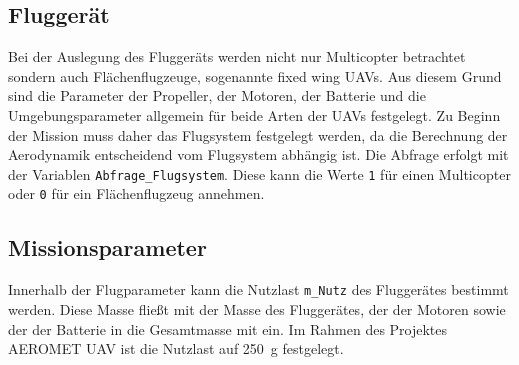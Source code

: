  
\subsection{Fluggerät}
\label{subsec:fluggerät}
Bei der Auslegung des Fluggeräts werden nicht nur Multicopter betrachtet sondern auch Flächenflugzeuge, sogenannte fixed wing UAVs. Aus diesem Grund sind die Parameter der Propeller, der Motoren, der Batterie und die Umgebungsparameter allgemein für beide Arten der UAVs festgelegt.
Zu Beginn der Mission muss daher das Flugsystem festgelegt werden, da die Berechnung der Aerodynamik entscheidend vom Flugsystem abhängig ist. Die Abfrage erfolgt mit der Variablen \texttt{Abfrage\_Flugsystem}. Diese kann die Werte \texttt{1} für einen Multicopter oder \texttt{0} für ein Flächenflugzeug annehmen.


\subsection{Missionsparameter}
Innerhalb der Flugparameter kann die Nutzlast \texttt{m\_Nutz} des Fluggerätes bestimmt werden. Diese Masse fließt mit der Masse des Fluggerätes, der der Motoren sowie der der Batterie in die Gesamtmasse mit ein. Im Rahmen des Projektes AEROMET UAV ist die Nutzlast auf \SI{250}{g} festgelegt.



